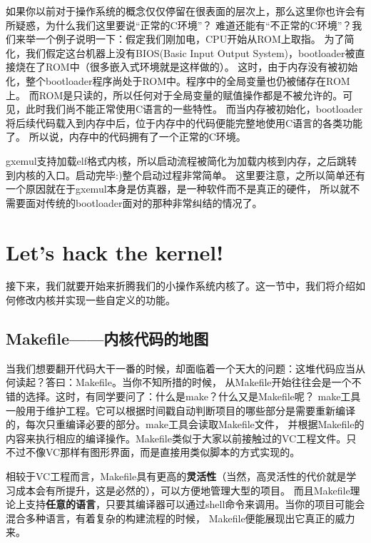 \begin{note}
如果你以前对于操作系统的概念仅仅停留在很表面的层次上，那么这里你也许会有所疑惑，为什么我们这里要说“正常的C环境”？
难道还能有“不正常的C环境”？我们来举一个例子说明一下：假定我们刚加电，CPU开始从ROM上取指。
为了简化，我们假定这台机器上没有BIOS(Basic Input Output System)，bootloader被直接烧在了ROM中（很多嵌入式环境就是这样做的）。
这时，由于内存没有被初始化，整个bootloader程序尚处于ROM中。程序中的全局变量也仍被储存在ROM上。
而ROM是只读的，所以任何对于全局变量的赋值操作都是不被允许的。可见，此时我们尚不能正常使用C语言的一些特性。
而当内存被初始化，bootloader将后续代码载入到内存中后，位于内存中的代码便能完整地使用C语言的各类功能了。
所以说，内存中的代码拥有了一个正常的C环境。
\end{note}

gxemul支持加载elf格式内核，所以启动流程被简化为加载内核到内存，之后跳转到内核的入口。启动完毕:)整个启动过程非常简单。
这里要注意，之所以简单还有一个原因就在于gxemul本身是仿真器，是一种软件而不是真正的硬件，
所以就不需要面对传统的bootloader面对的那种非常纠结的情况了。

\section{Let's hack the kernel!}

接下来，我们就要开始来折腾我们的小操作系统内核了。这一节中，我们将介绍如何修改内核并实现一些自定义的功能。

\subsection{Makefile——内核代码的地图}
当我们想要翻开代码大干一番的时候，却面临着一个天大的问题：这堆代码应当从何读起？答曰：Makefile。当你不知所措的时候，
从Makefile开始往往会是一个不错的选择。这时，有同学要问了：什么是make？什么又是Makefile呢？
make工具一般用于维护工程。它可以根据时间戳自动判断项目的哪些部分是需要重新编译的，每次只重编译必要的部分。make工具会读取Makefile文件，
并根据Makefile的内容来执行相应的编译操作。Makefile类似于大家以前接触过的VC工程文件。只不过不像VC那样有图形界面，而是直接用类似脚本的方式实现的。

\begin{note}
相较于VC工程而言，Makefile具有更高的\textbf{灵活性}（当然，高灵活性的代价就是学习成本会有所提升，这是必然的），可以方便地管理大型的项目。
而且Makefile理论上支持\textbf{任意的语言}，只要其编译器可以通过shell命令来调用。当你的项目可能会混合多种语言，有着复杂的构建流程的时候，
Makefile便能展现出它真正的威力来。
\end{note}

